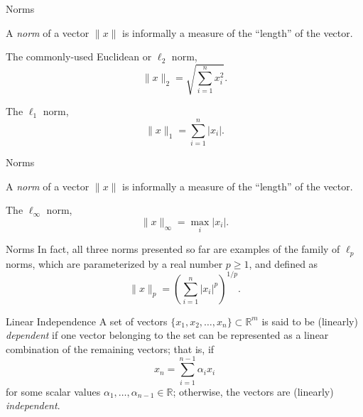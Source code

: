 \documentclass[aspectratio=169,12pt]{beamer}
\begin{document}
\begin{frame}[t]{Norms}
  \vspace{0.22cm}
  {\large
  A \emph{norm} of a vector $\|x\|$ is informally a measure of the ``length'' of
  the vector.

  \vspace{0.32cm}
  The commonly-used Euclidean or $\ell_2$ norm,
  \[
    \|x\|_2=\sqrt{\sum_{i=1}^{n}x_i^2}.
  \]

  The $\ell_1$ norm,
  \[
    \|x\|_1=\sum_{i=1}^{n}|x_i|.
  \]
  }
\end{frame}

\begin{frame}[t]{Norms}
  \vspace{0.55cm}
  {\large
  A \emph{norm} of a vector $\|x\|$ is informally a measure of the ``length'' of
  the vector.

  \vspace{1.15cm}
  \begin{center}
  The $\ell_\infty$ norm,
  \[
    \|x\|_\infty=\max_i|x_i|.
  \]
  \end{center}
  }
\end{frame}

\begin{frame}[t]{Norms}
  \vspace{1.05cm}
  {\large
  In fact, all three norms presented so far are examples of the family of $\ell_p$
  norms, which are parameterized by a real number $p\ge 1$, and defined as
  \[
    \|x\|_p=\left(\sum_{i=1}^{n}|x_i|^p\right)^{1/p}.
  \]
  }
\end{frame}

\begin{frame}[t]{Linear Independence}
  \vspace{0.55cm}
  {\small
  A set of vectors $\{x_1,x_2,\ldots,x_n\}\subset\mathbb{R}^{m}$ is said to be
  (linearly) \emph{dependent} if one vector belonging to the set can be represented
  as a linear combination of the remaining vectors; that is, if
  \[
    x_n=\sum_{i=1}^{n-1}\alpha_i x_i
  \]
  for some scalar values $\alpha_1,\ldots,\alpha_{n-1}\in\mathbb{R}$; otherwise,
  the vectors are (linearly) \emph{independent}.
  }
\end{frame}
\end{document}
